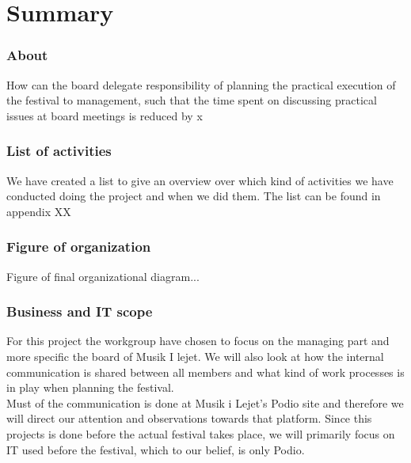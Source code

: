\part{Summary}

\section{About}

How can the board delegate responsibility of planning the practical execution of the festival to management, such that the time spent on discussing practical issues at board meetings is reduced by x%

\section{List of activities}
We have created a list to give an overview over which kind of activities we have conducted doing the project and when we did them. The list can be found in appendix XX

\section{Figure of organization}
Figure of final organizational diagram...

\section{Business and IT scope}
For this project the workgroup have chosen to focus on the managing part and more specific the board of Musik I lejet. We will also look at how the internal communication is shared between all members and what kind of work processes is in play when planning the festival. \\
Must of the communication is done at Musik i Lejet's Podio site and therefore we will direct our attention and observations towards that platform. Since this projects is done before the actual festival takes place, we will primarily focus on IT used before the festival, which to our belief, is only Podio.  
